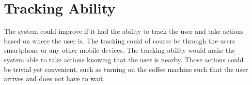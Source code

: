 \section{Tracking Ability}
The system could improve if it had the ability to track the user and take actions based on where the user is. The tracking could of course be through the users smartphone or any other mobile devices. The tracking ability would make the system able to take actions knowing that the user is nearby. Those actions could be trivial yet convenient, such as turning on the coffee machine such that the user arrives and does not have to wait.